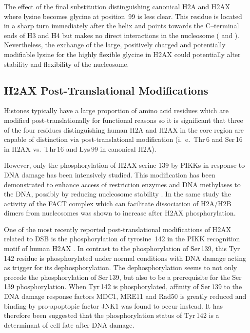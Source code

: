 The effect of the final substitution distinguishing canonical H2A and
H2AX where lysine becomes glycine at position~99 is less clear. This
residue is located in a sharp turn immediately after the 
helix and points towards the C--terminal ends of H3 and H4 but makes
no direct interactions in the nucleosome
( and
). Nevertheless, the exchange of the
large, positively charged and potentially modifiable lysine for the
highly flexible glycine in H2AX could potentially alter stability and
flexibility of the nucleosome.

\subsection{H2AX Post-Translational Modifications}
\label{subsec:h2ax-review:H2AX-PTM}
Histones typically have a large proportion of amino acid residues
which are modified post-translationally for functional reasons so it
is significant that three of the four residues distinguishing human
H2A and H2AX in the core region are capable of distinction via
post-translational modification (i.~e.\ Thr\,6 and Ser\,16 in H2AX
vs.\ Thr\,16 and Lys\,99 in canonical H2A).

However, only the phosphorylation of H2AX serine 139 by PIKKs in
response to DNA damage has been intensively studied. This modification
has been demonstrated to enhance access of restriction enzymes and DNA
methylases to the DNA, possibly by reducing nucleosome stability
\citep{KHHK+08}. In the same study the activity of the FACT complex
which can facilitate dissociation of H2A/H2B dimers from nucleosomes
was shown to increase after H2AX phosphorylation.

One of the most recently reported post-translational modifications of
H2AX related to DSB is the phosphorylation of tyrosine~142 in the PIKK
recognition motif of human H2AX \citep{XLS+09,CJT+09}. In contrast to
the phosphorylation of Ser\,139, this Tyr\,142 residue is
phosphorylated under normal conditions with DNA damage acting as
trigger for its dephosphorylation. The dephosphorylation seems to not
only precede the phosphorylation of Ser\,139, but also to be a
prerequisite for the Ser\,139 phosphorylation. When Tyr\,142 is
phosphorylated, affinity of Ser\,139 to the DNA damage response
factors MDC1, MRE11 and Rad50 is greatly reduced and binding by
pro-apoptopic factor JNK1 was found to occur instead. It has therefore
been suggested that the phosphorylation status of Tyr\,142 is a
determinant of cell fate after DNA damage.


